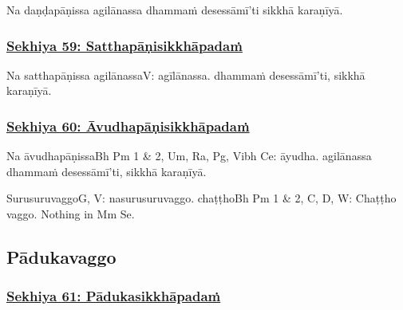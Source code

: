 Na daṇḍapāṇissa agilānassa dhammaṁ desessāmī'ti sikkhā karaṇīyā.



\subsubsection*{\hyperref[training59]{Sekhiya 59: Satthapāṇisikkhāpadaṁ}}
\label{sekh59}

Na satthapāṇissa agilānassa\makeatletter\hyperlink{endnote-appendix}\makeatother V: agīlānassa. dhammaṁ desessāmī'ti, sikkhā karaṇīyā.



\subsubsection*{\hyperref[training60]{Sekhiya 60: Āvudhapāṇisikkhāpadaṁ}}
\label{sekh60}

Na āvudhapāṇissa\makeatletter\hyperlink{endnote-appendix}\makeatother Bh Pm 1 & 2, Um, Ra, Pg, Vibh Ce: āyudha. agilānassa dhammaṁ desessāmī'ti, sikkhā karaṇīyā.

\begin{center}
	Surusuruvaggo\makeatletter\hyperlink{endnote-appendix}\makeatother G, V: nasurusuruvaggo. chaṭṭho\makeatletter\hyperlink{endnote-appendix}\makeatother Bh Pm 1 & 2, C, D, W: Chaṭṭho vaggo. Nothing in Mm Se.
\end{center}



\subsection{Pādukavaggo}

\subsubsection*{\hyperref[training61]{Sekhiya 61: Pādukasikkhāpadaṁ}}
\label{sekh61}

